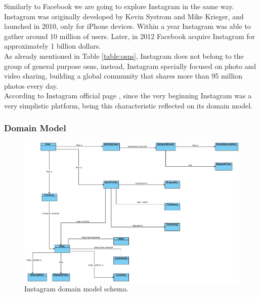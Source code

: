 Similarly to Facebook we are going to explore Instagram in the same way. Instagram was originally developed by Kevin Systrom and Mike Krieger, and launched in 2010, only
for iPhone devices. Within a year Instagram was able to gather around 10 million of users. Later, in 2012 Facebook acquire Instagram for approximately 1 billion dollars.\\
\indent As already mentioned in Table \ref{table:osns}, Instagram does not belong to the group of general purpose \glspl{osn}, instead, Instagram specially focused on photo
and video sharing, building a global community that shares more than 95 million photos every day.\\
\indent According to Instagram official page \footnotemark[9], since
the very beginning Instagram was a very simplistic platform, being this characteristic reflected on its domain model.

\subsubsection*{Domain Model}

\begin{figure}[h!]
  \hspace*{-1in}
  \includegraphics[width=1.28\textwidth]{img/instagram-domain-model.jpg}
\caption{\label{img:instadomain} Instagram domain model schema.}
\end{figure}

